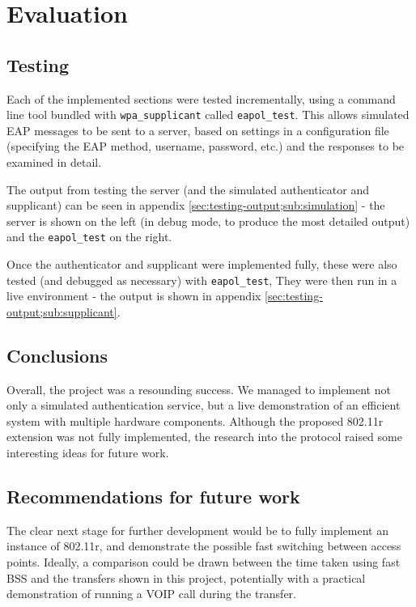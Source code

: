 \documentclass[12pt,a4paper,titlepage]{article}
\begin{document}
\newpage
\section{Evaluation}

\subsection{Testing}
Each of the implemented sections were tested incrementally, using a command line tool bundled with \texttt{wpa\_supplicant} called \texttt{eapol\_test}. This allows simulated EAP messages to be sent to a server, based on settings in a configuration file (specifying the EAP method, username, password, etc.) and the responses to be examined in detail. 

The output from testing the server (and the simulated authenticator and supplicant) can be seen in appendix \ref{sec:testing-output;sub:simulation} - the server is shown on the left (in debug mode, to produce the most detailed output) and the \texttt{eapol\_test} on the right. 

Once the authenticator and supplicant were implemented fully, these were also tested (and debugged as necessary) with \texttt{eapol\_test}, They were then run in a live environment - the output is shown in appendix \ref{sec:testing-output;sub:supplicant}.

\subsection{Conclusions}
Overall, the project was a resounding success. We managed to implement not only a simulated authentication service, but a live demonstration of an efficient system with multiple hardware components. Although the proposed 802.11r extension was not fully implemented, the research into the protocol raised some interesting ideas for future work.

\subsection{Recommendations for future work}
The clear next stage for further development would be to fully implement an instance of 802.11r, and demonstrate the possible fast switching between access points. Ideally, a comparison could be drawn between the time taken using fast BSS and the transfers shown in this project, potentially with a practical demonstration of running a VOIP call during the transfer.
\end{document}
